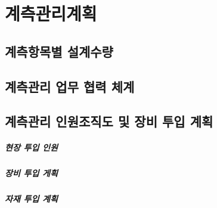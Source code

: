 \documentclass[12pt, a4paper, oneside]{book}
\let\stdsection\section
\renewcommand\section{\newpage\stdsection}
\begin{document}
	\chapter{계측관리계획}
	\minitoc				%
		

	\section{계측항목별 설계수량}
		
		
	\section{계측관리 업무 협력 체계}
		
		
	\section{계측관리 인원조직도 및 장비 투입 계획}
		
		\paragraph{현장 투입 인원}


		\paragraph{장비 투입 게획}
		

		\paragraph{자재 투입 계획}
		
\end{document}
